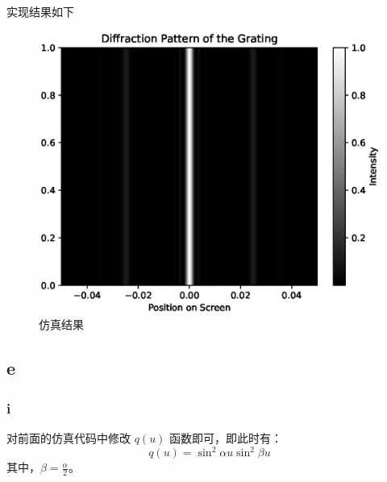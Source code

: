 \documentclass[UTF8]{ctexart}
\begin{document}
    实现结果如下
    \begin{figure}[h]
        \centering
        \includegraphics[height=0.42 \textheight]{problem4_d}
        \caption{仿真结果}\label{fig:figure4.4}
    \end{figure}

    \newpage
    \subsection{e}\label{subsec:section4.5}
    \subsubsection{i}\label{subsubsec:section4.5.1}
    对前面的仿真代码中修改 \(q(u)\) 函数即可，即此时有：
    \begin{equation*}
        q(u) = \sin^2 \alpha u \sin^2 \beta u
    \end{equation*}
    其中，\(\beta = \frac{\alpha}{2}\)。
\end{document}
